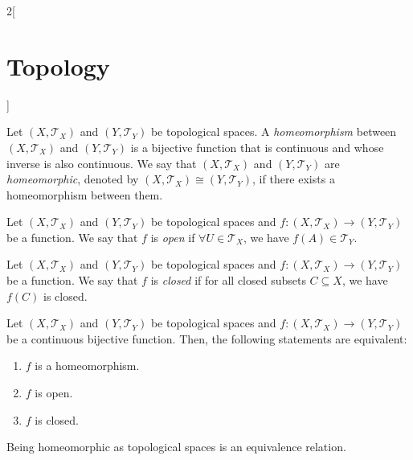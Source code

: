 \documentclass[../../../main.tex]{subfiles}
\begin{document}
\begin{multicols}{2}[\section{Topology}]
\begin{definition}
    Let $(X,\mathcal{T}_X)$ and $(Y,\mathcal{T}_Y)$ be topological spaces. A \textit{homeomorphism} between $(X,\mathcal{T}_X)$ and $(Y,\mathcal{T}_Y)$ is a bijective function that is continuous and whose inverse is also continuous. We say that $(X,\mathcal{T}_X)$ and $(Y,\mathcal{T}_Y)$ are \textit{homeomorphic}, denoted by $(X,\mathcal{T}_X)\cong(Y,\mathcal{T}_Y)$, if there exists a homeomorphism between them.
  \end{definition}
  \begin{definition}
    Let $(X,\mathcal{T}_X)$ and $(Y,\mathcal{T}_Y)$ be topological spaces and $f:(X,\mathcal{T}_X)\rightarrow (Y,\mathcal{T}_Y)$ be a function. We say that $f$ is \textit{open} if $\forall U\in\mathcal{T}_X$, we have $f(A)\in \mathcal{T}_Y$.
  \end{definition}
  \begin{definition}
    Let $(X,\mathcal{T}_X)$ and $(Y,\mathcal{T}_Y)$ be topological spaces and $f:(X,\mathcal{T}_X)\rightarrow (Y,\mathcal{T}_Y)$ be a function. We say that $f$ is \textit{closed} if for all closed subsets $C\subseteq X$, we have $f(C)$ is closed.
  \end{definition}
  \begin{prop}
    Let $(X,\mathcal{T}_X)$ and $(Y,\mathcal{T}_Y)$ be topological spaces and $f:(X,\mathcal{T}_X)\rightarrow (Y,\mathcal{T}_Y)$ be a continuous bijective function. Then, the following statements are equivalent:
    \begin{enumerate}
      \item $f$ is a homeomorphism.
      \item $f$ is open.
      \item $f$ is closed.
    \end{enumerate}
  \end{prop}
  \begin{prop}
    Being homeomorphic as topological spaces is an equivalence relation.
  \end{prop}

\end{multicols}
\end{document}
